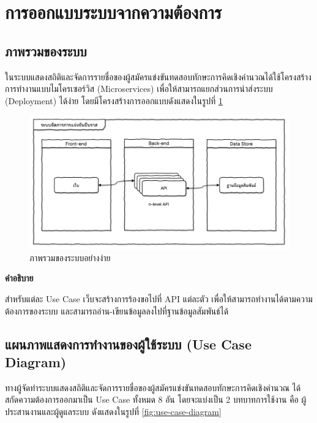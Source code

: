 \newpage

\section{การออกแบบระบบจากความต้องการ}
\subsection{ภาพรวมของระบบ}

ในระบบแสดงสถิติและจัดการรายชื่อของผู้สมัครแข่งขันทดสอบทักษะการคิดเชิงคำนวณได้ใช้โครงสร้างการทำงานแบบไมโครเซอร์วิส (Microservices) \cite{WhatAreMicroservices} เพื่อให้สามารถแยกส่วนการนำส่งระบบ (Deployment) ได้ง่าย โดยมีโครงสร้างการออกแบบดังแสดงในรูปที่ \ref{fig:simplified-system-overview-diagram}

\begin{figure}[H]
    \centering
    \includegraphics[width=125mm,scale=1.0]{diagrams/simplified-system-overview-diagram.png}
    \caption{ภาพรวมของระบบอย่างง่าย}
    \label{fig:simplified-system-overview-diagram}
\end{figure}

\textbf{คำอธิบาย}

สำหรับแต่ละ Use Case เว็บจะสร้างการร้องขอไปที่ API แต่ละตัว เพื่อให้สามารถทำงานได้ตามความต้องการของระบบ และสามารถอ่าน-เขียนข้อมูลลงไปที่ฐานข้อมูลสัมพันธ์ได้

\newpage

\subsection{แผนภาพแสดงการทำงานของผู้ใช้ระบบ (Use Case Diagram)}

ทางผู้จัดทำระบบแสดงสถิติและจัดการรายชื่อของผู้สมัครแข่งขันทดสอบทักษะการคิดเชิงคำนวณ ได้สกัดความต้องการออกมาเป็น Use Case ทั้งหมด 8 อัน โดยจะแบ่งเป็น 2 บทบาทการใช้งาน คือ ผู้ประสานงานและผู้ดูแลระบบ ดังแสดงในรูปที่ \ref{fig:use-case-diagram}

